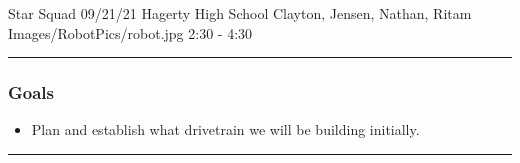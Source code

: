 \insertmeeting 
	{Star Squad} 
	{09/21/21}
	{Hagerty High School}
	{Clayton, Jensen, Nathan, Ritam}
	{Images/RobotPics/robot.jpg}
	{2:30 - 4:30}
	
\noindent\hfil\rule{\textwidth}{.4pt}\hfil
\subsubsection*{Goals}
\begin{itemize}
    \item Plan and establish what drivetrain we will be building initially.   

\end{itemize} 

\noindent\hfil\rule{\textwidth}{.4pt}\hfil


